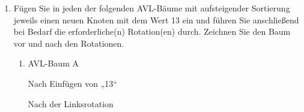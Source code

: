 \documentclass{bschlangaul-aufgabe}
\begin{document}
\begin{enumerate}
\begin{liDiagramm}{Nach Vertauschen von „42“ und „13“}
\end{liDiagramm}

\begin{liDiagramm}{Nach Vertauschen von „13“ und „28“}
\end{liDiagramm}


\item Fügen Sie in jeden der folgenden AVL-Bäume mit aufsteigender
Sortierung jeweils einen neuen Knoten mit dem Wert 13 ein und führen Sie
anschließend bei Bedarf die erforderliche(n) Rotation(en) durch.
Zeichnen Sie den Baum vor und nach den Rotationen.

\begin{enumerate}


\item AVL-Baum A


\begin{liDiagramm}{Nach Einfügen von „13“}
\end{liDiagramm}

\begin{liDiagramm}{Nach der Linksrotation}
\end{liDiagramm}


\end{enumerate}
\end{enumerate}
\end{document}
